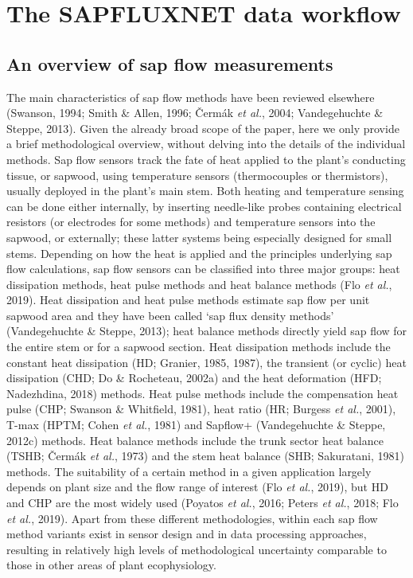 \documentclass[11pt,twoside]{reedthesis}
\begin{document}
\section{The SAPFLUXNET data
workflow}\label{the-sapfluxnet-data-workflow}

\subsection{An overview of sap flow
measurements}\label{an-overview-of-sap-flow-measurements}

The main characteristics of sap flow methods have been reviewed
elsewhere (Swanson, 1994; Smith \& Allen, 1996; Čermák \emph{et al.},
2004; Vandegehuchte \& Steppe, 2013). Given the already broad scope of
the paper, here we only provide a brief methodological overview, without
delving into the details of the individual methods. Sap flow sensors
track the fate of heat applied to the plant's conducting tissue, or
sapwood, using temperature sensors (thermocouples or thermistors),
usually deployed in the plant's main stem. Both heating and temperature
sensing can be done either internally, by inserting needle-like probes
containing electrical resistors (or electrodes for some methods) and
temperature sensors into the sapwood, or externally; these latter
systems being especially designed for small stems. Depending on how the
heat is applied and the principles underlying sap flow calculations, sap
flow sensors can be classified into three major groups: heat dissipation
methods, heat pulse methods and heat balance methods (Flo \emph{et al.},
2019). Heat dissipation and heat pulse methods estimate sap flow per
unit sapwood area and they have been called `sap flux density methods'
(Vandegehuchte \& Steppe, 2013); heat balance methods directly yield sap
flow for the entire stem or for a sapwood section. Heat dissipation
methods include the constant heat dissipation (HD; Granier, 1985, 1987),
the transient (or cyclic) heat dissipation (CHD; Do \& Rocheteau, 2002a)
and the heat deformation (HFD; Nadezhdina, 2018) methods. Heat pulse
methods include the compensation heat pulse (CHP; Swanson \& Whitfield,
1981), heat ratio (HR; Burgess \emph{et al.}, 2001), T-max (HPTM; Cohen
\emph{et al.}, 1981) and Sapflow+ (Vandegehuchte \& Steppe, 2012c)
methods. Heat balance methods include the trunk sector heat balance
(TSHB; Čermák \emph{et al.}, 1973) and the stem heat balance (SHB;
Sakuratani, 1981) methods. The suitability of a certain method in a
given application largely depends on plant size and the flow range of
interest (Flo \emph{et al.}, 2019), but HD and CHP are the most widely
used (Poyatos \emph{et al.}, 2016; Peters \emph{et al.}, 2018; Flo
\emph{et al.}, 2019). Apart from these different methodologies, within
each sap flow method variants exist in sensor design and in data
processing approaches, resulting in relatively high levels of
methodological uncertainty comparable to those in other areas of plant
ecophysiology.\par
\end{document}
